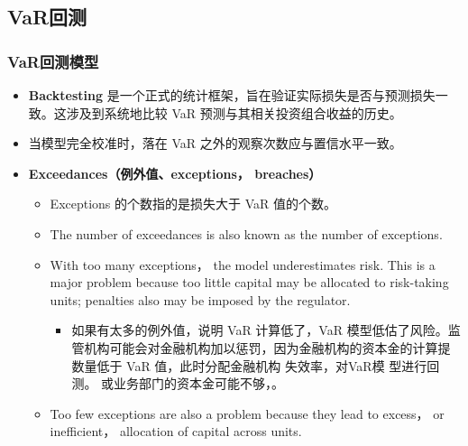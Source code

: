 \subsection{VaR回测}






\subsubsection{VaR回测模型}
    \begin{itemize}
    \item \textbf{Backtesting} 是一个正式的统计框架，旨在验证实际损失是否与预测损失一致。这涉及到系统地比较 VaR 预测与其相关投资组合收益的历史。\\
    \item 当模型完全校准时，落在 VaR 之外的观察次数应与置信水平一致。
    \item \textbf{Exceedances（例外值、exceptions， breaches）}
        \begin{itemize}
        \item Exceptions 的个数指的是损失大于 VaR 值的个数。
        \item The number of exceedances is also known as the number of exceptions.
        \item With too many exceptions， the model underestimates risk. This is a major problem because too little capital may be allocated to risk-taking units; penalties also may be imposed by the regulator.
        \begin{itemize}
     
        \item 如果有太多的例外值，说明 VaR 计算低了，VaR 模型低估了风险。监管机构可能会对金融机构加以惩罚，因为金融机构的资本金的计算提数量低于 VaR 值，此时分配金融机构
        失效率，对VaR模
        型进行回测。
        或业务部门的资本金可能不够，。

    \end{itemize}
        \item Too few exceptions are also a problem because they lead to excess， or inefficient， allocation of capital across units.
        \begin{itemize}


\end{itemize}
\end{itemize}
\end{itemize}
